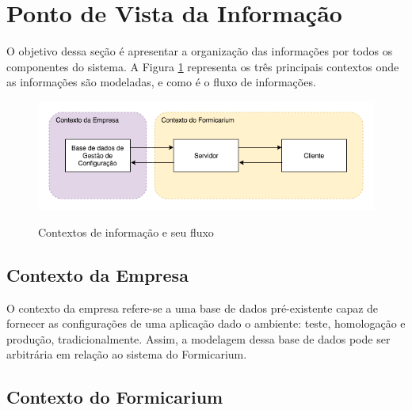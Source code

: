 	\section{Ponto de Vista da Informação}
	    O objetivo dessa seção é apresentar a organização das informações por todos os componentes do sistema. A Figura \ref{fig:info-contexts} representa os três principais contextos onde as informações são modeladas, e como é o fluxo de informações. 
	    \begin{figure}[htb]
    	    \centering
    	    \caption{Contextos de informação e seu fluxo}
    	    \includegraphics[scale=0.67]{pictures/especificacao-de-projeto/information-contexts.png}
    	    \label{fig:info-contexts}
	    \end{figure}
	    \subsection{Contexto da Empresa}
	        O contexto da empresa refere-se a uma base de dados pré-existente capaz de fornecer as configurações de uma aplicação dado o ambiente: teste, homologação e produção, tradicionalmente. Assim, a modelagem dessa base de dados pode ser arbitrária em relação ao sistema do Formicarium.
	    \subsection{Contexto do Formicarium}
